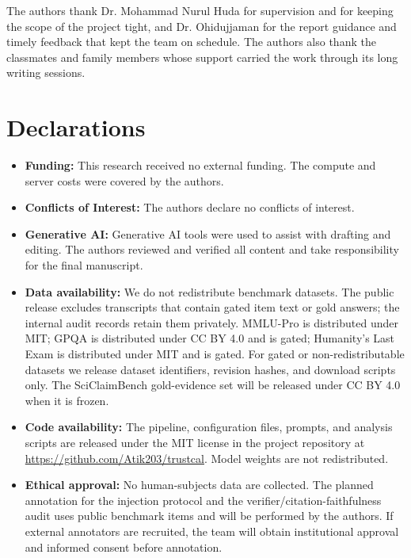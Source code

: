 \documentclass[a4paper,fleqn]{cas-sc}
\begin{document}
The authors thank Dr. Mohammad Nurul Huda for supervision and for keeping the scope of the project tight, and Dr. Ohidujjaman for the report guidance and timely feedback that kept the team on schedule. The authors also thank the classmates and family members whose support carried the work through its long writing sessions.

\section*{Declarations}
\begin{itemize}
  \item \textbf{Funding:} This research received no external funding. The compute and server costs were covered by the authors.

  \item \textbf{Conflicts of Interest:} The authors declare no conflicts of interest.

  \item \textbf{Generative AI:} Generative AI tools were used to assist with drafting and editing. The authors reviewed and verified all content and take responsibility for the final manuscript.

  \item \textbf{Data availability:} We do not redistribute benchmark datasets. The public release excludes transcripts that contain gated item text or gold answers; the internal audit records retain them privately. MMLU-Pro is distributed under MIT; GPQA is distributed under CC BY 4.0 and is gated; Humanity's Last Exam is distributed under MIT and is gated. For gated or non-redistributable datasets we release dataset identifiers, revision hashes, and download scripts only. The SciClaimBench gold-evidence set will be released under CC BY 4.0 when it is frozen.

  \item \textbf{Code availability:} The pipeline, configuration files, prompts, and analysis scripts are released under the MIT license in the project repository at \url{https://github.com/Atik203/trustcal}. Model weights are not redistributed.

  \item \textbf{Ethical approval:} No human-subjects data are collected. The planned annotation for the injection protocol and the verifier/citation-faithfulness audit uses public benchmark items and will be performed by the authors. If external annotators are recruited, the team will obtain institutional approval and informed consent before annotation.
\end{itemize}
\end{document}
